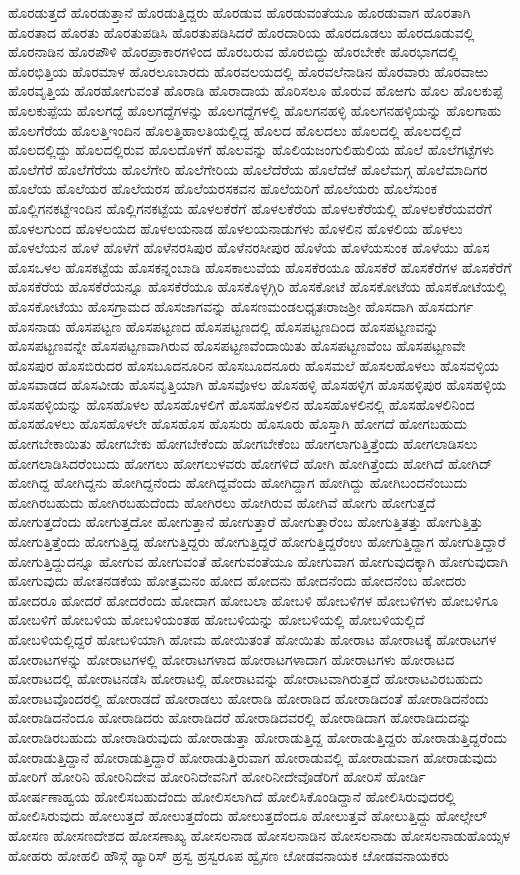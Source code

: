 {ಹೊರಡುತ್ತದೆ
ಹೊರಡುತ್ತಾನೆ
ಹೊರಡುತ್ತಿದ್ದರು
ಹೊರಡುವ
ಹೊರಡುವಂತೆಯೂ
ಹೊರಡುವಾಗ
ಹೊರತಾಗಿ
ಹೊರತಾದ
ಹೊರತು
ಹೊರತುಪಡಿಸಿ
ಹೊರತುಪಡಿಸಿದರೆ
ಹೊರದಾರಿಯ
ಹೊರದೂಡಲು
ಹೊರದೂಡುವಲ್ಲಿ
ಹೊರನಾಡಿನ
ಹೊರಪೌಳಿ
ಹೊರಪ್ರಾಕಾರಗಳಿಂದ
ಹೊರಬರುವ
ಹೊರಬಿದ್ದು
ಹೊರಬೇಕೇ
ಹೊರಭಾಗದಲ್ಲಿ
ಹೊರಭಿತ್ತಿಯ
ಹೊರಮಾಳ
ಹೊರಲೂಬಾರದು
ಹೊರವಲಯದಲ್ಲಿ
ಹೊರವಲೆನಾಡಿನ
ಹೊರವಾರು
ಹೊರವಾಱು
ಹೊರವೃತ್ತಿಯ
ಹೊರಹೋಗುವಂತೆ
ಹೊರಾಡಿ
ಹೊರಾದಾಯ
ಹೊರಿಸಲೂ
ಹೊರುವ
ಹೊಱಗು
ಹೊಲ
ಹೊಲಕುಪ್ಪೆ
ಹೊಲಕುಪ್ಪೆಯ
ಹೊಲಗದ್ದೆ
ಹೊಲಗದ್ದೆಗಳನ್ನು
ಹೊಲಗದ್ದೆಗಳಲ್ಲಿ
ಹೊಲಗನಹಳ್ಳಿ
ಹೊಲಗನಹಳ್ಳಿಯನ್ನು
ಹೊಲಗಾಹು
ಹೊಲಗೆರೆಯ
ಹೊಲತ್ತಿಇಂದಿನ
ಹೊಲತ್ತಿಹಾಲತಿಯಲ್ಲಿದ್ದ
ಹೊಲದ
ಹೊಲದಲು
ಹೊಲದಲ್ಲಿ
ಹೊಲದಲ್ಲಿದೆ
ಹೊಲದಲ್ಲಿದ್ದು
ಹೊಲದಲ್ಲಿರುವ
ಹೊಲದೊಳಗೆ
ಹೊಲವನ್ನು
ಹೊಲಿಯಜಂಗುಲಿಹುಲಿಯ
ಹೊಲೆ
ಹೊಲೆಗಟ್ಟೆಗಳು
ಹೊಲೆಗೆರೆ
ಹೊಲೆಗೆರೆಯ
ಹೊಲೆಗೇರಿ
ಹೊಲೆಗೇರಿಯ
ಹೊಲೆದೆರೆಯ
ಹೊಲೆದೆಱೆ
ಹೊಲೆಮಗ್ಗ
ಹೊಲೆಮಾದಿಗರ
ಹೊಲೆಯ
ಹೊಲೆಯರ
ಹೊಲೆಯರಸ
ಹೊಲೆಯರಸಕವನ
ಹೊಲೆಯರಿಗೆ
ಹೊಲೆಯರು
ಹೊಲೆಸುಂಕ
ಹೊಲ್ಲಿಗನಕಟ್ಟೆಇಂದಿನ
ಹೊಲ್ಲಿಗನಕಟ್ಟೆಯ
ಹೊಳಲಕೆರೆಗೆ
ಹೊಳಲಕೆರೆಯ
ಹೊಳಲಕೆರೆಯಲ್ಲಿ
ಹೊಳಲಕೆರೆಯವರೆಗೆ
ಹೊಳಲಗುಂದ
ಹೊಳಲಯದ
ಹೊಳಲಯನಾಡ
ಹೊಳಲಯನಾಡುಗಳು
ಹೊಳಲಿನ
ಹೊಳಲಿಯ
ಹೊಳಲು
ಹೊಳಲೆಯನ
ಹೊಳೆ
ಹೊಳೆಗೆ
ಹೊಳೆನರಸಿಪುರ
ಹೊಳೆನರಸೀಪುರ
ಹೊಳೆಯ
ಹೊಳೆಯಸುಂಕ
ಹೊಳೆಯು
ಹೊಸ
ಹೊಸಒಳಲ
ಹೊಸಕಟ್ಟೆಯ
ಹೊಸಕನ್ನಂಬಾಡಿ
ಹೊಸಕಾಲುವೆಯ
ಹೊಸಕೆರಯೂ
ಹೊಸಕೆರೆ
ಹೊಸಕೆರೆಗಳ
ಹೊಸಕೆರೆಗೆ
ಹೊಸಕೆರೆಯ
ಹೊಸಕೆರೆಯನ್ನೂ
ಹೊಸಕೆರೆಯೂ
ಹೊಸಕೊಳ್ಳಗ್ಗಿರಿ
ಹೊಸಕೋಟೆ
ಹೊಸಕೋಟೆಯ
ಹೊಸಕೋಟೆಯಲ್ಲಿ
ಹೊಸಕೋಟೆಯು
ಹೊಸಗ್ರಾಮದ
ಹೊಸಜಾಗವನ್ನು
ಹೊಸಣಮಂಡಲಧೃತಃರಾಜಶ್ರೀ
ಹೊಸದಾಗಿ
ಹೊಸದುರ್ಗ
ಹೊಸನಾಡು
ಹೊಸಪಟ್ಟಣ
ಹೊಸಪಟ್ಟಣದ
ಹೊಸಪಟ್ಟಣದಲ್ಲಿ
ಹೊಸಪಟ್ಟಣದಿಂದ
ಹೊಸಪಟ್ಟಣವನ್ನು
ಹೊಸಪಟ್ಟಣವನ್ನೇ
ಹೊಸಪಟ್ಟಣವಾಗಿರುವ
ಹೊಸಪಟ್ಟಣವೆಂದಾಯಿತು
ಹೊಸಪಟ್ಟಣವೆಂಬ
ಹೊಸಪಟ್ಟಣವೇ
ಹೊಸಪುರ
ಹೊಸಬಿರುದರ
ಹೊಸಬೂದನೂರಿನ
ಹೊಸಬೂದನೂರು
ಹೊಸಮಲೆ
ಹೊಸಲಹೊಳಲು
ಹೊಸವಳ್ಳಿಯ
ಹೊಸವಾಡದ
ಹೊಸವೀಡು
ಹೊಸವೃತ್ತಿಯಾಗಿ
ಹೊಸವೊಳಲ
ಹೊಸಹಳ್ಳಿ
ಹೊಸಹಳ್ಳಿಗ
ಹೊಸಹಳ್ಳಿಪುರ
ಹೊಸಹಳ್ಳಿಯ
ಹೊಸಹಳ್ಳಿಯನ್ನು
ಹೊಸಹೊಳಲ
ಹೊಸಹೊಳಲಿಗೆ
ಹೊಸಹೊಳಲಿನ
ಹೊಸಹೊಳಲಿನಲ್ಲಿ
ಹೊಸಹೊಳಲಿನಿಂದ
ಹೊಸಹೊಳಲು
ಹೊಸಹೊಳಲೇ
ಹೊಸಹೊಸ
ಹೊಸುರು
ಹೊಸೂರು
ಹೊಸ್ತಾಗಿ
ಹೋಗದೆ
ಹೋಗಬಹುದು
ಹೋಗಬೇಕಾಯಿತು
ಹೋಗಬೇಕು
ಹೋಗಬೇಕೆಂದು
ಹೋಗಬೇಕೆಂಬ
ಹೋಗಲಾಗುತ್ತಿತ್ತೆಂದು
ಹೋಗಲಾಡಿಸಲು
ಹೋಗಲಾಡಿಸಿದರೆಂಬುದು
ಹೋಗಲು
ಹೋಗಲುಳವರು
ಹೋಗಳಿದೆ
ಹೋಗಿ
ಹೋಗಿತ್ತೆಂದು
ಹೋಗಿದೆ
ಹೋಗಿದ್
ಹೋಗಿದ್ದ
ಹೋಗಿದ್ದನು
ಹೋಗಿದ್ದನೆಂದು
ಹೋಗಿದ್ದವೆಂದು
ಹೋಗಿದ್ದಾಗ
ಹೋಗಿದ್ದು
ಹೋಗಿಬಂದನೆಂಬುದು
ಹೋಗಿರಬಹುದು
ಹೋಗಿರಬಹುದೆಂದು
ಹೋಗಿರಲು
ಹೋಗಿರುವ
ಹೋಗಿವೆ
ಹೋಗು
ಹೋಗುತ್ತದೆ
ಹೋಗುತ್ತದೆಂದು
ಹೋಗುತ್ತದೋ
ಹೋಗುತ್ತಾನೆ
ಹೋಗುತ್ತಾರೆ
ಹೋಗುತ್ತಾರೆಂಬ
ಹೋಗುತ್ತಿತತ್ತು
ಹೋಗುತ್ತಿತ್ತು
ಹೋಗುತ್ತಿತ್ತೆಂದು
ಹೋಗುತ್ತಿದ್ದ
ಹೋಗುತ್ತಿದ್ದರು
ಹೋಗುತ್ತಿದ್ದರೆ
ಹೋಗುತ್ತಿದ್ದರೆಂಉ
ಹೋಗುತ್ತಿದ್ದಾಗ
ಹೋಗುತ್ತಿದ್ದಾರೆ
ಹೋಗುತ್ತಿದ್ದುದನ್ನೂ
ಹೋಗುವ
ಹೋಗುವಂತೆ
ಹೋಗುವಂತೆಯೂ
ಹೋಗುವಾಗ
ಹೋಗುವುದಕ್ಕಾಗಿ
ಹೋಗುವುದಾಗಿ
ಹೋಗುವುದು
ಹೋತನಡಕೆಯ
ಹೋತ್ತಮನಂ
ಹೋದ
ಹೋದನು
ಹೋದನೆಂದು
ಹೋದನೆಂಬ
ಹೋದರು
ಹೋದರೂ
ಹೋದರೆ
ಹೋದರೆಂದು
ಹೋದಾಗ
ಹೋಬಲಾ
ಹೋಬಳಿ
ಹೋಬಳಿಗಳ
ಹೋಬಳಿಗಳು
ಹೋಬಳಿಗೂ
ಹೋಬಳಿಗೆ
ಹೋಬಳಿಯ
ಹೋಬಳಿಯಂತಹ
ಹೋಬಳಿಯನ್ನು
ಹೋಬಳಿಯಲ್ಲಿ
ಹೋಬಳಿಯಲ್ಲಿದೆ
ಹೋಬಳಿಯಲ್ಲಿದ್ದರೆ
ಹೋಬಳಿಯಾಗಿ
ಹೋಮ
ಹೋಯಿತಂತೆ
ಹೋಯಿತು
ಹೋರಾಟ
ಹೋರಾಟಕ್ಕೆ
ಹೋರಾಟಗಳ
ಹೋರಾಟಗಳನ್ನು
ಹೋರಾಟಗಳಲ್ಲಿ
ಹೋರಾಟಗಳಾದ
ಹೋರಾಟಗಳಾದಾಗ
ಹೋರಾಟಗಳು
ಹೋರಾಟದ
ಹೋರಾಟದಲ್ಲಿ
ಹೋರಾಟನಡೆಸಿ
ಹೋರಾಟಲ್ಲಿ
ಹೋರಾಟವನ್ನು
ಹೋರಾಟವಾಗಿರುತ್ತದೆ
ಹೋರಾಟವಿರಬಹುದು
ಹೋರಾಟವೊಂದರಲ್ಲಿ
ಹೋರಾಡದೆ
ಹೋರಾಡಲು
ಹೋರಾಡಿ
ಹೋರಾಡಿದ
ಹೋರಾಡಿದಂತೆ
ಹೋರಾಡಿದನೆಂದು
ಹೋರಾಡಿದನೆಂದೂ
ಹೋರಾಡಿದರು
ಹೋರಾಡಿದರೆ
ಹೋರಾಡಿದವರಲ್ಲಿ
ಹೋರಾಡಿದಾಗ
ಹೋರಾಡಿದುದನ್ನು
ಹೋರಾಡಿರಬಹುದು
ಹೋರಾಡಿರುವುದು
ಹೋರಾಡುತ್ತಾ
ಹೋರಾಡುತ್ತಿದ್ದ
ಹೋರಾಡುತ್ತಿದ್ದರು
ಹೋರಾಡುತ್ತಿದ್ದರೆಂದು
ಹೋರಾಡುತ್ತಿದ್ದಾನೆ
ಹೋರಾಡುತ್ತಿದ್ದಾರೆ
ಹೋರಾಡುತ್ತಿರುವಾಗ
ಹೋರಾಡುವಲ್ಲಿ
ಹೋರಾಡುವಾಗ
ಹೋರಾಡುವುದು
ಹೋರಿಗೆ
ಹೋರಿನಿ
ಹೋರಿನಿದೇವ
ಹೋರಿನಿದೇವನಿಗೆ
ಹೋರಿನೀದೇವೊಡೆರಿಗೆ
ಹೋರಿಸೆ
ಹೋರ್ಡಿ
ಹೋರ್ಷಣಾಹ್ವಯ
ಹೋಲಿಸಬಹುದೆಂದು
ಹೋಲಿಸಲಾಗಿದೆ
ಹೋಲಿಸಿಕೊಂಡಿದ್ದಾನೆ
ಹೋಲಿಸಿರುವುದರಲ್ಲಿ
ಹೋಲಿಸಿರುವುದು
ಹೋಲುತ್ತದೆ
ಹೋಲುತ್ತದೆಂದು
ಹೋಲುತ್ತದೆಂದೂ
ಹೋಲುತ್ತವೆ
ಹೋಲುತ್ತಿದ್ದು
ಹೋಲ್ಸೇಲ್
ಹೋಸಣ
ಹೋಸಣದೇಶದ
ಹೋಸಣಾಖ್ಯ
ಹೋಸಲನಾಡ
ಹೋಸಲನಾಡಿನ
ಹೋಸಲನಾಡು
ಹೋಸಲನಾಡುಹೊಯ್ಸಳ
ಹೋಹರು
ಹೋಹಲಿ
ಹೌಸ್ಗೆ
ಹ್ಯಾರಿಸ್
ಹ್ರಸ್ವ
ಹ್ರಸ್ವರೂಪ
ಹ್ವೈಸಣ
ೞೋಡವನಾಯಕ
ೞೋಡವನಾಯಕರು
}
